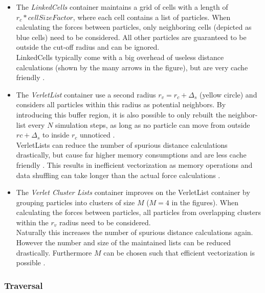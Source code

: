 \documentclass[conference]{IEEEtran}
\begin{document}
\begin{itemize}
    \item The \textit{LinkedCells} container maintains a grid of cells with a length of ${r_c} * \textit{cellSizeFactor}$, where each cell contains a list of particles. When calculating the forces between particles, only neighboring cells (depicted as blue cells) need to be considered. All other particles are guaranteed to be outside the cut-off radius and can be ignored. \\
          LinkedCells typically come with a big overhead of useless distance calculations (shown by the many arrows in the figure), but are very cache friendly \cite{Gratl2022AutoPas}.

    \item The \textit{VerletList} container use a second radius $r_v = {r_c} + \Delta_s$ (yellow circle) and considers all particles within this radius as potential neighbors. By introducing this buffer region, it is also possible to only rebuilt the neighbor-list every $N$ simulation steps, as long as no particle can move from outside $rc+ \Delta_s$ to inside $r_c$ unnoticed \cite{NEWCOME2023115278}. \\
          VerletLists can reduce the number of spurious distance calculations drastically, but cause far higher memory consumptions and are less cache friendly \cite{Gratl2022AutoPas}. This results in inefficient vectorization as memory operations and data shuffling can take longer than the actual force calculations \cite{PALL20132641}.

    \item The \textit{Verlet Cluster Lists} container improves on the VerletList container by grouping particles into clusters of size $M$ ($M=4$ in the figures). When calculating the forces between particles, all particles from overlapping clusters within the $r_v$ radius need to be considered.\\
          Naturally this increases the number of spurious distance calculations again. However the number and size of the maintained lists can be reduced drastically. Furthermore $M$ can be chosen such that efficient vectorization is possible \cite{Gratl2022AutoPas}.

\end{itemize}


\subsubsection{Traversal}
\end{document}
